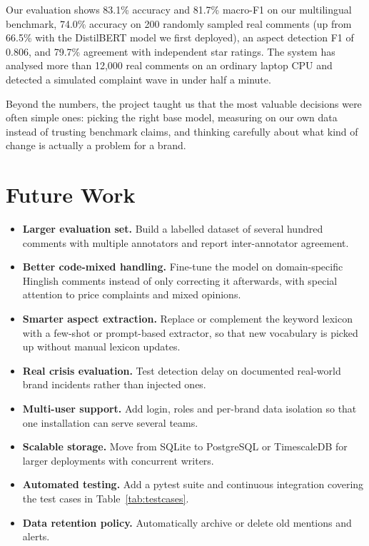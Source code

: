 \documentclass[12pt,a4paper]{report}
\begin{document}
Our evaluation shows 83.1\% accuracy and 81.7\% macro-F1 on our multilingual benchmark, 74.0\% accuracy on 200 randomly sampled real comments (up from 66.5\% with the DistilBERT model we first deployed), an aspect detection F1 of 0.806, and 79.7\% agreement with independent star ratings. The system has analysed more than 12,000 real comments on an ordinary laptop CPU and detected a simulated complaint wave in under half a minute.

Beyond the numbers, the project taught us that the most valuable decisions were often simple ones: picking the right base model, measuring on our own data instead of trusting benchmark claims, and thinking carefully about what kind of change is actually a problem for a brand.

\section{Future Work}

\begin{itemize}
    \item \textbf{Larger evaluation set.} Build a labelled dataset of several hundred comments with multiple annotators and report inter-annotator agreement.
    \item \textbf{Better code-mixed handling.} Fine-tune the model on domain-specific Hinglish comments instead of only correcting it afterwards, with special attention to price complaints and mixed opinions.
    \item \textbf{Smarter aspect extraction.} Replace or complement the keyword lexicon with a few-shot or prompt-based extractor, so that new vocabulary is picked up without manual lexicon updates.
    \item \textbf{Real crisis evaluation.} Test detection delay on documented real-world brand incidents rather than injected ones.
    \item \textbf{Multi-user support.} Add login, roles and per-brand data isolation so that one installation can serve several teams.
    \item \textbf{Scalable storage.} Move from SQLite to PostgreSQL or TimescaleDB for larger deployments with concurrent writers.
    \item \textbf{Automated testing.} Add a pytest suite and continuous integration covering the test cases in Table~\ref{tab:testcases}.
    \item \textbf{Data retention policy.} Automatically archive or delete old mentions and alerts.
\end{itemize}
\end{document}
